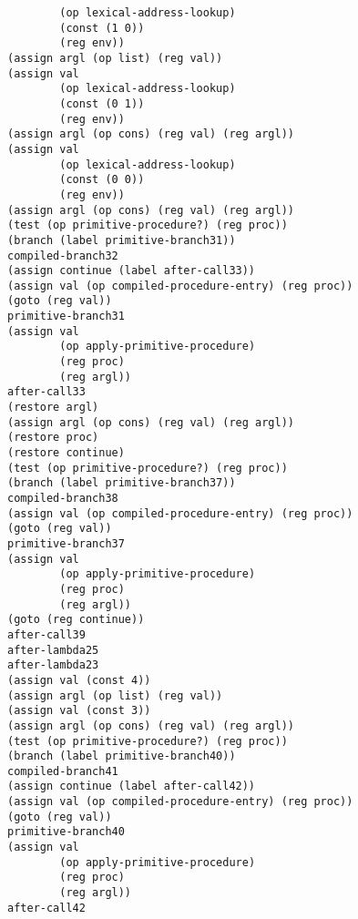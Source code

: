 \documentclass[a4paper,12pt]{article}
\begin{document}
\begin{lstlisting}
        (op lexical-address-lookup)
        (const (1 0))
        (reg env))
(assign argl (op list) (reg val))
(assign val
        (op lexical-address-lookup)
        (const (0 1))
        (reg env))
(assign argl (op cons) (reg val) (reg argl))
(assign val
        (op lexical-address-lookup)
        (const (0 0))
        (reg env))
(assign argl (op cons) (reg val) (reg argl))
(test (op primitive-procedure?) (reg proc))
(branch (label primitive-branch31))
compiled-branch32
(assign continue (label after-call33))
(assign val (op compiled-procedure-entry) (reg proc))
(goto (reg val))
primitive-branch31
(assign val
        (op apply-primitive-procedure)
        (reg proc)
        (reg argl))
after-call33
(restore argl)
(assign argl (op cons) (reg val) (reg argl))
(restore proc)
(restore continue)
(test (op primitive-procedure?) (reg proc))
(branch (label primitive-branch37))
compiled-branch38
(assign val (op compiled-procedure-entry) (reg proc))
(goto (reg val))
primitive-branch37
(assign val
        (op apply-primitive-procedure)
        (reg proc)
        (reg argl))
(goto (reg continue))
after-call39
after-lambda25
after-lambda23
(assign val (const 4))
(assign argl (op list) (reg val))
(assign val (const 3))
(assign argl (op cons) (reg val) (reg argl))
(test (op primitive-procedure?) (reg proc))
(branch (label primitive-branch40))
compiled-branch41
(assign continue (label after-call42))
(assign val (op compiled-procedure-entry) (reg proc))
(goto (reg val))
primitive-branch40
(assign val
        (op apply-primitive-procedure)
        (reg proc)
        (reg argl))
after-call42
\end{lstlisting}
\end{document}
